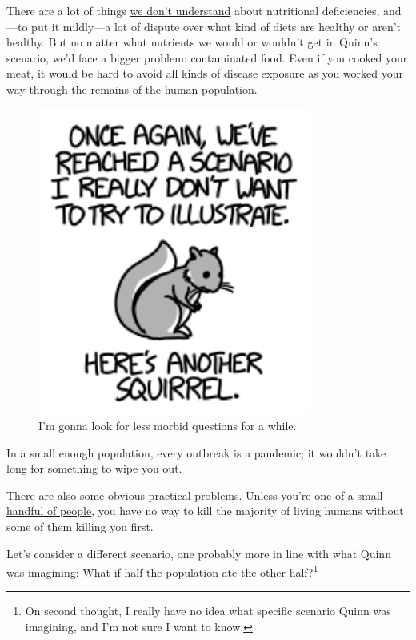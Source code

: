 {{There are a lot of things \href{http://www.nature.com/news/nutrition-vitamins-on-trial-1.15459}{we don't understand} about nutritional deficiencies, and—to put it mildly—a lot of dispute over what kind of diets are healthy or aren't healthy. But no matter what nutrients we would or wouldn't get in Quinn's scenario, we'd face a bigger problem: contaminated food. Even if you cooked your meat, it would be hard to avoid all kinds of disease exposure as you worked your way through the remains of the human population.}

\begin{figure}[!htbp]
\centering
\includegraphics[scale=0.5, max width=0.8\textwidth]{imgs/a/105/squirrel.png}
\caption{I'm gonna look for less morbid questions for a while.}
\end{figure}

{In a small enough population, every outbreak is a pandemic; it wouldn't take long for something to wipe you out.}

{There are also some obvious practical problems. Unless you're one of \href{https://en.wikipedia.org/wiki/Nuclear\_briefcase}{a small handful of people}, you have no way to kill the majority of living humans without some of them killing you first.}

{Let's consider a different scenario, one probably more in line with what Quinn was imagining: What if half the population ate the other half?{\footnote{On second thought, I really have no idea what specific scenario Quinn was imagining, and I'm not sure I want to know.} } }

}
